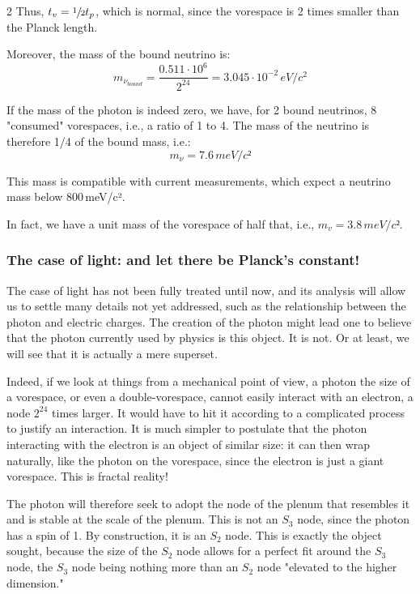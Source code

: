 \begin{multicols}{2}
	Thus, $t_v = \sfrac{1}{2}t_p$, which is normal, since the vorespace is 2 times smaller than the Planck length.
	
	Moreover, the mass of the bound neutrino is:
	\begin{equation*}
		m_{\nu_{bound}} = \frac {0.511 \cdot 10^6}{2^{24}} = 3.045 \cdot 10^{-2}\,eV/c^2
	\end{equation*}
	
	If the mass of the photon is indeed zero, we have, for 2 bound neutrinos, 8 "consumed" vorespaces, i.e., a ratio of 1 to 4. The mass of the neutrino is therefore 1/4 of the bound mass, i.e.:
	\begin{equation*}
		m_{\nu}= 7.6\,meV/c²
	\end{equation*}
	
	This mass is compatible with current measurements, which expect a neutrino mass below 800\,meV/c².
	
	In fact, we have a unit mass of the vorespace of half that, i.e., $m_v = 3.8\,meV/c²$.
	
	\subsubsection{The case of light: and let there be Planck's constant!}
	
	The case of light has not been fully treated until now, and its analysis will allow us to settle many details not yet addressed, such as the relationship between the photon and electric charges. The creation of the photon might lead one to believe that the photon currently used by physics is this object. It is not. Or at least, we will see that it is actually a mere superset.
	
	Indeed, if we look at things from a mechanical point of view, a photon the size of a vorespace, or even a double-vorespace, cannot easily interact with an electron, a node $2^{24}$ times larger. It would have to hit it according to a complicated process to justify an interaction. It is much simpler to postulate that the photon interacting with the electron is an object of similar size: it can then wrap naturally, like the photon on the vorespace, since the electron is just a giant vorespace. This is fractal reality!
	
	The photon will therefore seek to adopt the node of the plenum that resembles it and is stable at the scale of the plenum. This is not an $S_3$ node, since the photon has a spin of 1. By construction, it is an $S_2$ node. This is exactly the object sought, because the size of the $S_2$ node allows for a perfect fit around the $S_3$ node, the $S_3$ node being nothing more than an $S_2$ node "elevated to the higher dimension."
	

\end{multicols}
